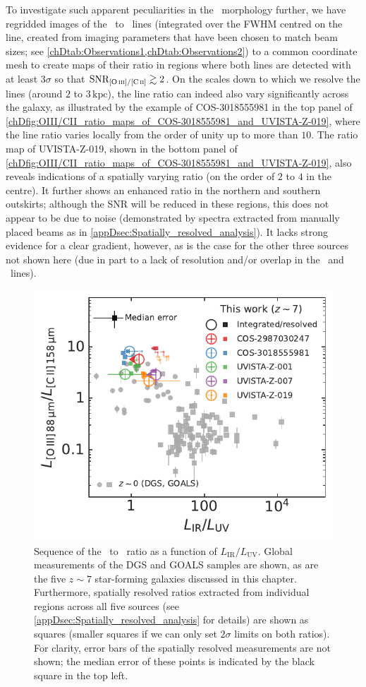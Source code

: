 To investigate such apparent peculiarities in the \OIIIf\ morphology further, we have regridded images of the \OIIILam\ to \CIILam\ lines (integrated over the FWHM centred on the line, created from imaging parameters that have been chosen to match beam sizes; see \cref{chDtab:Observations1,chDtab:Observations2}) to a common coordinate mesh to create maps of their ratio in regions where both lines are detected with at least $3 \sigma$ so that $\text{SNR}_{\OIIIf/\CII} \gtrsim 2$. On the scales down to which we resolve the lines (around $2$ to $3 \, \mathrm{kpc}$), the line ratio can indeed also vary significantly across the galaxy, as illustrated by the example of COS-3018555981 in the top panel of \cref{chDfig:OIII/CII_ratio_maps_of_COS-3018555981_and_UVISTA-Z-019}, where the line ratio varies locally from the order of unity up to more than $10$. The ratio map of UVISTA-Z-019, shown in the bottom panel of \cref{chDfig:OIII/CII_ratio_maps_of_COS-3018555981_and_UVISTA-Z-019}, also reveals indications of a spatially varying ratio (on the order of $2$ to $4$ in the centre). It further shows an enhanced ratio in the northern and southern outskirts; although the SNR will be reduced in these regions, this does not appear to be due to noise (demonstrated by spectra extracted from manually placed beams as in \cref{appDsec:Spatially_resolved_analysis}). It lacks strong evidence for a clear gradient, however, as is the case for the other three sources not shown here (due in part to a lack of resolution and/or overlap in the \OIIIf\ and \CII\ lines).
\begin{figure}[t]
    \centering
    \includegraphics[width=0.6\linewidth]{"Plots/ChapterD/L_IR_L_UV_peak_UV_cont_luminosity_ratios"}
    \caption[Spatially resolved sequence of \OIIILam\ to \CIILam\ ratio as a function of $L_\text{IR}/L_\text{UV}$.]{Sequence of the \OIIILam\ to \CIILam\ ratio as a function of $L_\text{IR}/L_\text{UV}$. Global measurements of the DGS and GOALS samples are shown, as are the five $z \sim 7$ star-forming galaxies discussed in this chapter. Furthermore, spatially resolved ratios extracted from individual regions across all five sources (see \cref{appDsec:Spatially_resolved_analysis} for details) are shown as squares (smaller squares if we can only set $2 \sigma$ limits on both ratios). For clarity, error bars of the spatially resolved measurements are not shown; the median error of these points is indicated by the black square in the top left.
    }
    \label{chDfig:Spatially_resolved_OIII/CII_vs_L_IR/L_UV_sequence}
\end{figure}

